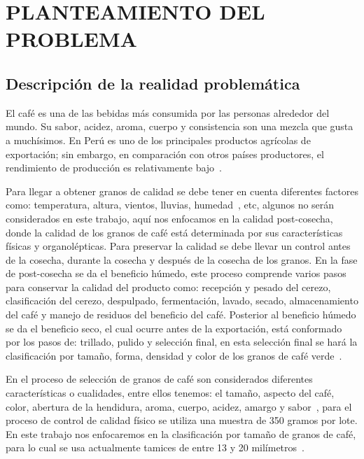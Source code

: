\chapter{PLANTEAMIENTO DEL PROBLEMA}
\label{chapter:problema}

\section{Descripción de la realidad problemática}
\label{section:description}
El café es una de las bebidas más consumida por las personas alrededor del mundo. Su sabor, acidez, aroma, cuerpo y consistencia son una mezcla que gusta a muchísimos. En Perú es uno de los principales productos agrícolas de exportación; sin embargo, en comparación con otros países productores, el rendimiento de producción es relativamente bajo~\citep{Diaz2017}.

Para llegar a obtener granos de calidad se debe tener en cuenta diferentes factores como: temperatura, altura, vientos, lluvias, humedad~\citep{Figueroa2015}, etc, algunos no serán considerados en este trabajo, aquí nos enfocamos en la calidad post-cosecha, donde la calidad de los granos de café está determinada por sus características físicas y organolépticas. Para preservar la calidad se debe llevar un control antes de la cosecha, durante la cosecha y después de la cosecha de los granos. En la fase de post-cosecha se da el beneficio húmedo, este proceso comprende varios pasos para conservar la calidad del producto como: recepción y pesado del cerezo, clasificación del cerezo, despulpado, fermentación, lavado, secado, almacenamiento del café y manejo de residuos del beneficio del café. Posterior al beneficio húmedo se da el beneficio seco, el cual ocurre antes de la exportación, está conformado por los pasos de: trillado, pulido y selección final, en esta selección final se hará la clasificación por tamaño, forma, densidad y color de los granos de café verde~\citep{Marin2013}.

En el proceso de selección de granos de café son considerados diferentes características o cualidades, entre ellos tenemos: el tamaño, aspecto del café, color, abertura de la hendidura, aroma, cuerpo, acidez, amargo y sabor~\citep{Lara2005}, para el proceso de control de calidad físico se utiliza una muestra de 350 gramos por lote. En este trabajo nos enfocaremos en la clasificación por tamaño de granos de café, para lo cual se usa actualmente tamices de entre 13 y 20 milímetros~\citep{Marin2013}. 

